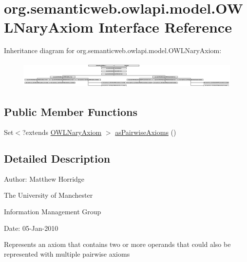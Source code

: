 \hypertarget{interfaceorg_1_1semanticweb_1_1owlapi_1_1model_1_1_o_w_l_nary_axiom}{\section{org.\-semanticweb.\-owlapi.\-model.\-O\-W\-L\-Nary\-Axiom Interface Reference}
\label{interfaceorg_1_1semanticweb_1_1owlapi_1_1model_1_1_o_w_l_nary_axiom}
}
Inheritance diagram for org.\-semanticweb.\-owlapi.\-model.\-O\-W\-L\-Nary\-Axiom\-:\begin{figure}[H]
\begin{center}
\leavevmode
\includegraphics[height=1.410579cm]{interfaceorg_1_1semanticweb_1_1owlapi_1_1model_1_1_o_w_l_nary_axiom}
\end{center}
\end{figure}
\subsection*{Public Member Functions}
\begin{DoxyCompactItemize}
\item 
Set$<$?extends \hyperlink{interfaceorg_1_1semanticweb_1_1owlapi_1_1model_1_1_o_w_l_nary_axiom}{O\-W\-L\-Nary\-Axiom} $>$ \hyperlink{interfaceorg_1_1semanticweb_1_1owlapi_1_1model_1_1_o_w_l_nary_axiom_a6e42e510fb68505141c962a0598f2d44}{as\-Pairwise\-Axioms} ()
\end{DoxyCompactItemize}


\subsection{Detailed Description}
Author\-: Matthew Horridge\par
 The University of Manchester\par
 Information Management Group\par
 Date\-: 05-\/\-Jan-\/2010 

Represents an axiom that contains two or more operands that could also be represented with multiple pairwise axioms 

